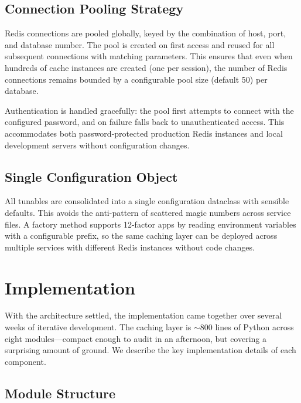 \documentclass[conference]{IEEEtran}
\begin{document}
\subsection{Connection Pooling Strategy}

Redis connections are pooled globally, keyed by the combination of host, port, and database number. The pool is created on first access and reused for all subsequent connections with matching parameters. This ensures that even when hundreds of cache instances are created (one per session), the number of Redis connections remains bounded by a configurable pool size (default 50) per database.

Authentication is handled gracefully: the pool first attempts to connect with the configured password, and on failure falls back to unauthenticated access. This accommodates both password-protected production Redis instances and local development servers without configuration changes.

\subsection{Single Configuration Object}

All tunables are consolidated into a single configuration dataclass with sensible defaults. This avoids the anti-pattern of scattered magic numbers across service files. A factory method supports 12-factor apps by reading environment variables with a configurable prefix, so the same caching layer can be deployed across multiple services with different Redis instances without code changes.

\section{Implementation}
\label{sec:implementation}

With the architecture settled, the implementation came together over several weeks of iterative development. The caching layer is ${\sim}800$ lines of Python across eight modules---compact enough to audit in an afternoon, but covering a surprising amount of ground. We describe the key implementation details of each component.

\subsection{Module Structure}
\end{document}
